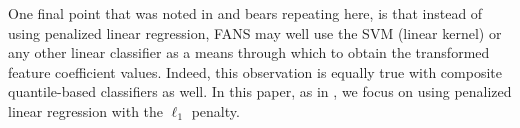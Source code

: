 One final point that was noted in \cite{fan2016} and bears repeating here, is
that instead of using penalized linear regression, FANS may well use the SVM
(linear kernel) or any other linear classifier as a means through which to
obtain the transformed feature coefficient values.  Indeed, this observation is
equally true with composite quantile-based classifiers as well.  In this paper,
as in \cite{fan2016}, we focus on using penalized linear regression with the
$\ell_1$ penalty.










